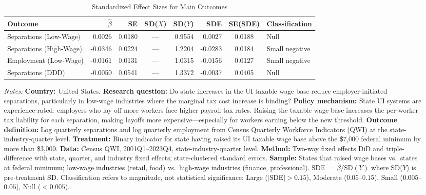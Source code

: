 \begin{table}[H]
\centering
\caption{Standardized Effect Sizes for Main Outcomes}
\label{tab:sde}
\begin{threeparttable}
\footnotesize
\begin{tabular}{@{}lrrcrrcl@{}}
\toprule
Outcome & $\hat{\beta}$ & SE & SD($X$) & SD($Y$) & SDE & SE(SDE) & Classification \\
\midrule
Separations (Low-Wage) & 0.0026 & 0.0180 & --- & 0.9554 & 0.0027 & 0.0188 & Null \\
Separations (High-Wage) & -0.0346 & 0.0224 & --- & 1.2204 & -0.0283 & 0.0184 & Small negative \\
Employment (Low-Wage) & -0.0161 & 0.0131 & --- & 1.0315 & -0.0156 & 0.0127 & Small negative \\
Separations (DDD) & -0.0050 & 0.0541 & --- & 1.3372 & -0.0037 & 0.0405 & Null \\
\bottomrule
\end{tabular}
\begin{tablenotes}[flushleft]
\scriptsize
\item \textit{Notes:} \textbf{Country:} United States. \textbf{Research question:} Do state increases in the UI taxable wage base reduce employer-initiated separations, particularly in low-wage industries where the marginal tax cost increase is binding? \textbf{Policy mechanism:} State UI systems are experience-rated: employers who lay off more workers face higher payroll tax rates. Raising the taxable wage base increases the per-worker tax liability for each separation, making layoffs more expensive---especially for workers earning below the new threshold. \textbf{Outcome definition:} Log quarterly separations and log quarterly employment from Census Quarterly Workforce Indicators (QWI) at the state-industry-quarter level. \textbf{Treatment:} Binary indicator for state having raised its UI taxable wage base above the \$7,000 federal minimum by more than \$3,000. \textbf{Data:} Census QWI, 2001Q1--2023Q4, state-industry-quarter level. \textbf{Method:} Two-way fixed effects DiD and triple-difference with state, quarter, and industry fixed effects; state-clustered standard errors. \textbf{Sample:} States that raised wage bases vs.\ states at federal minimum; low-wage industries (retail, food) vs.\ high-wage industries (finance, professional). SDE $= \hat{\beta} / \text{SD}(Y)$ where SD($Y$) is pre-treatment SD. Classification refers to magnitude, not statistical significance: Large ($|$SDE$| > 0.15$), Moderate ($0.05$--$0.15$), Small ($0.005$--$0.05$), Null ($< 0.005$).
\end{tablenotes}
\end{threeparttable}
\end{table}

